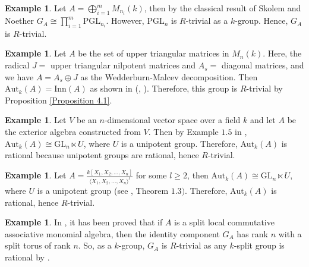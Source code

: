 \documentclass[12pt]{amsart}
\theoremstyle{definition}
\newtheorem{example}[theorem]{Example}
\numberwithin{equation}{section}
\begin{document}
\vskip1mm

\begin{example}\label{Example 4.2}
Let $A=\bigoplus_{i=1}^{m} M_{n_i}(k)$, then by the classical result of Skolem and Noether $G_A\cong \prod_{i=1}^{m} \text{PGL}_{n_{i}}$. However, $\text{PGL}_n$ is $R$-trivial as a $k$-group. Hence, $G_A$ is $R$-trivial.
\end{example}


\vskip2mm

\begin{example}\label{Example 4.3}
Let $A$ be the set of upper triangular matrices in $M_n(k)$. Here, the radical $J=$ upper triangular nilpotent matrices and $A_s=$ diagonal matrices, and we have $A=A_s\oplus J$ as the Wedderburn-Malcev decomposition. Then $\text{Aut}_k(A)=\text{Inn}(A)$ as shown in (\cite{Pollack}, \cite{Stanley}). Therefore, this group is $R$-trivial by Proposition \ref{Proposition 4.1}.
\end{example}

\vskip2mm

\begin{example}\label{Example 4.4}
Let $V$ be an $n$-dimensional vector space over a field $k$ and let $A$ be the exterior algebra constructed from $V$. Then by Example $1.5$ in \cite{Pollack}, $\text{Aut}_k(A)\cong \text{GL}_n\ltimes U$, where $U$ is a unipotent group. Therefore, $\text{Aut}_k(A)$ is rational because unipotent groups are rational, hence $R$-trivial.
\end{example}

\vskip2mm

\begin{example}\label{Example 4.5}
Let $A=\displaystyle\frac{k[X_1,X_2,\dots,X_n]}{\langle X_1,X_2,\dots,X_n\rangle^l}$ for some $l\geq 2$, then $\text{Aut}_k(A)\cong \mathrm{GL}_n\ltimes U$, where $U$ is a unipotent group (see \cite{AS1}, Theorem $1.3)$. Therefore, $\text{Aut}_k(A)$ is rational, hence $R$-trivial.
\end{example}

\vskip2mm

\begin{example}\label{Example 4.6}
In \cite{AS1}, it has been proved that if $A$ is a split local commutative associative monomial algebra, then the identity component $G_A$ has rank $n$ with a split torus of rank $n$. So, as a $k$-group, $G_A$ is $R$-trivial as any $k$-split group is rational by \cite{VT}. 
\end{example}

\vskip2mm
\end{document}
